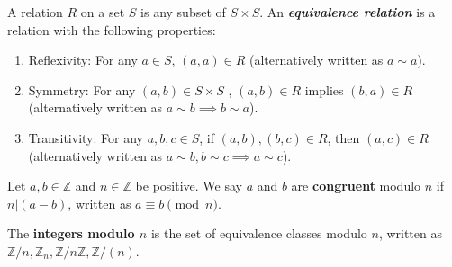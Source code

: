 \documentclass [12pt] {article}
\newcommand{\Z}{\mathbb{Z}}
\newenvironment{definition}[1]{\begin{tcolorbox}[title={Definition: #1},colback=green!5!white,colframe=black!75!green]}{\end{tcolorbox}}
\renewcommand{\bf}[1]{\textbf{{#1}}}
\newcommand{\ib}[1]{\textit{\textbf{{#1}}}}
\begin{document}
\begin{definition}{Equivalence Relation}
    A relation $R$ on a set $S$ is any subset of $S \times S$.
    An \ib{equivalence relation} is a relation with the following properties:
    \begin{enumerate}
        \item Reflexivity: For any $a \in S$, $(a, a) \in R$ (alternatively written as $a \sim a$).
        \item Symmetry: For any $(a, b) \in S \times S$ , $(a, b) \in R$ implies $(b, a) \in R$
            (alternatively written as $a \sim b \implies b \sim a$).
        \item Transitivity: For any $a, b, c \in S$, if $(a, b), (b, c) \in R$, then $(a, c) \in R$ 
            (alternatively written as $a \sim b, b \sim c \implies a \sim c$).
    \end{enumerate}
\end{definition}

\begin{definition}{Congruent Modulo $n$}
    Let $a, b \in \Z$ and $n \in \Z$ be positive. We say $a$ and $b$ are \bf{congruent} modulo $n$
    if $n | (a - b)$, written as $a \equiv b \pmod{n}$.
    \vspace{1em}

    The \bf{integers modulo $n$} is the set of equivalence classes modulo $n$, written as
    $\Z/n, \Z_n, \Z/n\Z, \Z/(n)$.
\end{definition}
\end{document}
